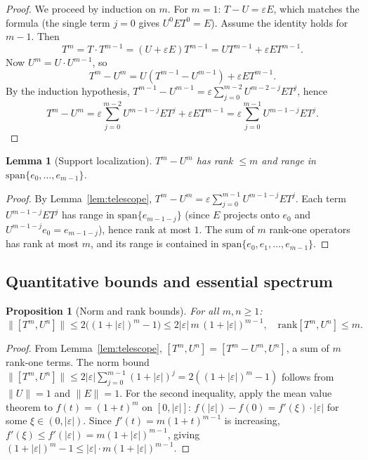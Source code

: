 \documentclass[10pt]{amsart}
\newcommand{\1}{{\mathbb{I}}}
\newtheorem{prop}[theorem]{Proposition}
\newtheorem{lemma}[theorem]{Lemma}
\numberwithin{equation}{section}
\begin{document}
\begin{proof}
We proceed by induction on $m$. For $m = 1$: $T - U = \varepsilon E$, which matches
the formula (the single term $j=0$ gives $U^0 E T^0 = E$). Assume the identity holds
for $m-1$. Then
\[
T^m = T \cdot T^{m-1} = (U + \varepsilon E) T^{m-1}
= U T^{m-1} + \varepsilon E T^{m-1}.
\]
Now $U^m = U \cdot U^{m-1}$, so
\[
T^m - U^m = U(T^{m-1} - U^{m-1}) + \varepsilon E T^{m-1}.
\]
By the induction hypothesis,
$T^{m-1} - U^{m-1} = \varepsilon \sum_{j=0}^{m-2} U^{m-2-j} E T^j$, hence
\[
T^m - U^m = \varepsilon \sum_{j=0}^{m-2} U^{m-1-j} E T^j + \varepsilon E T^{m-1}
= \varepsilon \sum_{j=0}^{m-1} U^{m-1-j} E T^j.
\]
\end{proof}

\begin{lemma}[Support localization]\label{lem:support}
$T^m - U^m$ has rank $\le m$ and range in $\mathrm{span}\{e_0,\dots,e_{m-1}\}$.
\end{lemma}

\begin{proof}
By Lemma~\ref{lem:telescope}, $T^m - U^m = \varepsilon \sum_{j=0}^{m-1} U^{m-1-j} E T^j$.
Each term $U^{m-1-j} E T^j$ has range in $\mathrm{span}\{e_{m-1-j}\}$ (since $E$ projects
onto $e_0$ and $U^{m-1-j} e_0 = e_{m-1-j}$), hence rank at most $1$. The sum of $m$
rank-one operators has rank at most $m$, and its range is contained in
$\mathrm{span}\{e_0, e_1, \dots, e_{m-1}\}$.
\end{proof}

\subsection{Quantitative bounds and essential spectrum}

\begin{prop}[Norm and rank bounds]\label{prop:bounds}
For all $m, n \ge 1$:
\[
\|[T^m, U^n]\| \le 2\bigl((1+|\varepsilon|)^m - 1\bigr)
\le 2|\varepsilon|\, m\, (1 + |\varepsilon|)^{m-1},
\quad \mathrm{rank}[T^m, U^n] \le m.
\]
\end{prop}
\begin{proof}
From Lemma~\ref{lem:telescope}, $[T^m,U^n] = [T^m - U^m, U^n]$, a sum of $m$ rank-one terms.
The norm bound $\|[T^m,U^n]\| \le 2|\varepsilon|\sum_{j=0}^{m-1}(1+|\varepsilon|)^j
= 2((1+|\varepsilon|)^m-1)$ follows from $\|U\|=1$ and $\|E\|=1$.
For the second inequality, apply the mean value theorem to $f(t) = (1+t)^m$ on $[0,|\varepsilon|]$:
$f(|\varepsilon|) - f(0) = f'(\xi) \cdot |\varepsilon|$ for some $\xi \in (0,|\varepsilon|)$.
Since $f'(t) = m(1+t)^{m-1}$ is increasing, $f'(\xi) \le f'(|\varepsilon|)
= m(1+|\varepsilon|)^{m-1}$, giving $(1+|\varepsilon|)^m - 1 \le |\varepsilon| \cdot m (1+|\varepsilon|)^{m-1}$.
\end{proof}
\end{document}
